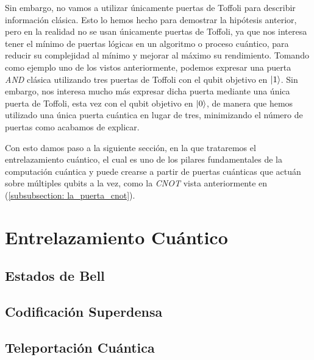 \documentclass{article}
\numberwithin{equation}{section} %
\begin{document}
    \vspace{5mm}

    Sin embargo, no vamos a utilizar únicamente puertas de Toffoli para describir información clásica. Esto lo hemos hecho para demostrar la hipótesis anterior, pero en la realidad no se usan únicamente puertas de Toffoli, ya que nos interesa tener el mínimo de puertas lógicas en un algoritmo o proceso cuántico, para reducir su complejidad al mínimo y mejorar al máximo su rendimiento. Tomando como ejemplo uno de los vistos anteriormente, podemos expresar una puerta \textit{AND} clásica utilizando tres puertas de Toffoli con el qubit objetivo en \( \ket{1} \). Sin embargo, nos interesa mucho más expresar dicha puerta mediante una única puerta de Toffoli, esta vez con el qubit objetivo en \( \ket{0} \), de manera que hemos utilizado una única puerta cuántica en lugar de tres, minimizando el número de puertas como acabamos de explicar.

    \vspace{5mm}

    Con esto damos paso a la siguiente sección, en la que trataremos el entrelazamiento cuántico, el cual es uno de los pilares fundamentales de la computación cuántica y puede crearse a partir de puertas cuánticas que actuán sobre múltiples qubits a la vez, como la \textit{CNOT} vista anteriormente en (\ref{subsubsection: la_puerta_cnot}).

        
        
        
        






    \newpage
    \thispagestyle{empty}
    \mbox{}

    \section{Entrelazamiento Cuántico}\label{sec: entrelazamiento_cuantico}
    \subsection{Estados de Bell}
    \subsection{Codificación Superdensa}
    \subsection{Teleportación Cuántica}
\end{document}
